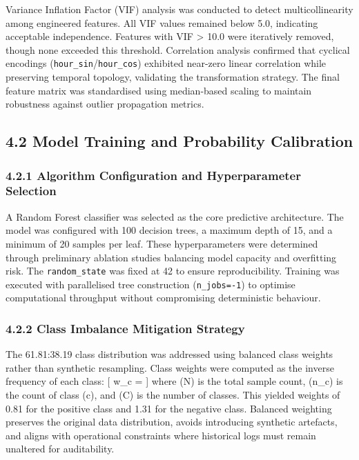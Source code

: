 Variance Inflation Factor (VIF) analysis was conducted to detect
multicollinearity among engineered features. All VIF values remained
below 5.0, indicating acceptable independence. Features with VIF
\textgreater{} 10.0 were iteratively removed, though none exceeded this
threshold. Correlation analysis confirmed that cyclical encodings
(\texttt{hour\_sin}/\texttt{hour\_cos}) exhibited near-zero linear
correlation while preserving temporal topology, validating the
transformation strategy. The final feature matrix was standardised using
median-based scaling to maintain robustness against outlier propagation
metrics.

\subsection{4.2 Model Training and Probability
Calibration}\label{model-training-and-probability-calibration}

\subsubsection{4.2.1 Algorithm Configuration and Hyperparameter
Selection}\label{algorithm-configuration-and-hyperparameter-selection}

A Random Forest classifier was selected as the core predictive
architecture. The model was configured with 100 decision trees, a
maximum depth of 15, and a minimum of 20 samples per leaf. These
hyperparameters were determined through preliminary ablation studies
balancing model capacity and overfitting risk. The
\texttt{random\_state} was fixed at 42 to ensure reproducibility.
Training was executed with parallelised tree construction
(\texttt{n\_jobs=-1}) to optimise computational throughput without
compromising deterministic behaviour.

\subsubsection{4.2.2 Class Imbalance Mitigation
Strategy}\label{class-imbalance-mitigation-strategy}

The 61.81:38.19 class distribution was addressed using balanced class
weights rather than synthetic resampling. Class weights were computed as
the inverse frequency of each class: {[} w\_c = 
{]} where (N) is the total sample count, (n\_c) is the count of class
(c), and (C) is the number of classes. This yielded weights of 0.81 for
the positive class and 1.31 for the negative class. Balanced weighting
preserves the original data distribution, avoids introducing synthetic
artefacts, and aligns with operational constraints where historical logs
must remain unaltered for auditability.

